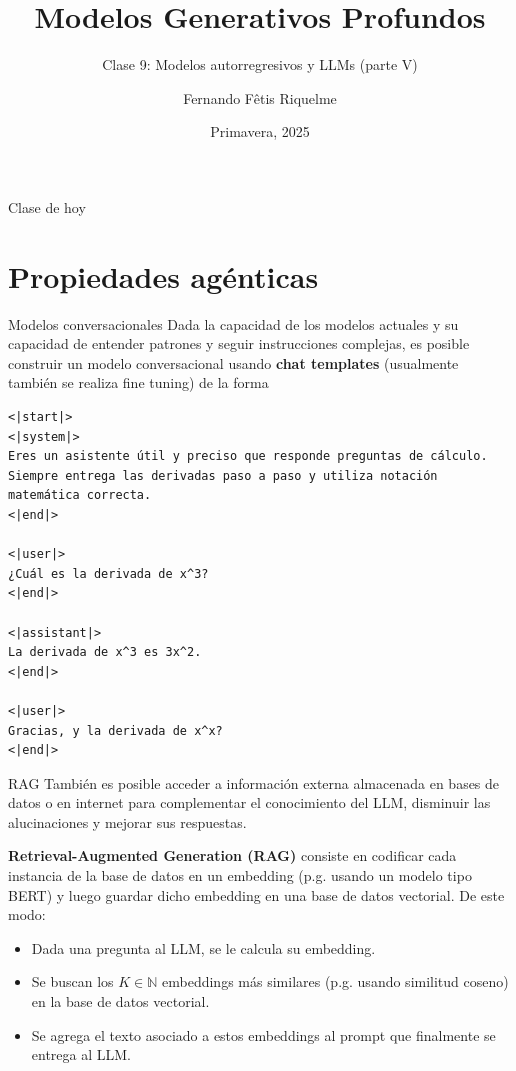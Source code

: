 \documentclass{beamer}
\title{Modelos Generativos Profundos}
\subtitle{Clase 9: Modelos autorregresivos y LLMs (parte V)}
\author{Fernando Fêtis Riquelme}
\institute{
    Facultad de Ciencias Físicas y Matemáticas\\
    Universidad de Chile
}
\date{Primavera, 2025}
\newcommand{\N}{\mathbb{N}}
\begin{document}
\begin{frame}
    \titlepage
\end{frame}

\begin{frame}{Clase de hoy}
    \tableofcontents
\end{frame}

\section{Propiedades agénticas}

\begin{frame}[fragile]{Modelos conversacionales}
    Dada la capacidad de los modelos actuales y su capacidad de entender patrones y seguir instrucciones complejas, es posible construir un modelo conversacional usando \textbf{chat templates} (usualmente también se realiza fine tuning) de la forma

    \tiny
    \begin{verbatim}
<|start|>
<|system|>
Eres un asistente útil y preciso que responde preguntas de cálculo. 
Siempre entrega las derivadas paso a paso y utiliza notación matemática correcta.
<|end|>

<|user|>
¿Cuál es la derivada de x^3?
<|end|>

<|assistant|>
La derivada de x^3 es 3x^2.
<|end|>

<|user|>
Gracias, y la derivada de x^x?
<|end|>
\end{verbatim}
\end{frame}

\begin{frame}{RAG}
    También es posible acceder a información externa almacenada en bases de datos o en internet para complementar el conocimiento del LLM, disminuir las alucinaciones y mejorar sus respuestas.

    \textbf{Retrieval-Augmented Generation (RAG)} consiste en codificar cada instancia de la base de datos en un embedding (p.g. usando un modelo tipo BERT) y luego guardar dicho embedding en una base de datos vectorial. De este modo:
    \begin{itemize}
        \item Dada una pregunta al LLM, se le calcula su embedding.
        \item Se buscan los $K\in\N$ embeddings más similares (p.g. usando similitud coseno) en la base de datos vectorial.
        \item Se agrega el texto asociado a estos embeddings al prompt que finalmente se entrega al LLM.
    \end{itemize}
\end{frame}
\end{document}
